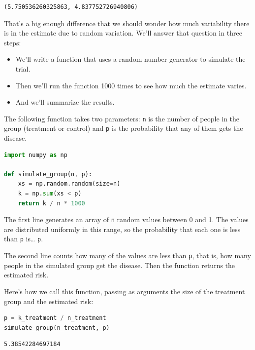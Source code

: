 \begin{lstlisting}[style=output]
(5.750536260325863, 4.837752726940806)
\end{lstlisting}

That's a big enough difference that we should wonder how much
variability there is in the estimate due to random variation. We'll
answer that question in three steps:

\begin{itemize}
\item
  We'll write a function that uses a random number generator to simulate
  the trial.
\item
  Then we'll run the function 1000 times to see how much the estimate
  varies.
\item
  And we'll summarize the results.
\end{itemize}

The following function takes two parameters: \passthrough{\lstinline!n!}
is the number of people in the group (treatment or control) and
\passthrough{\lstinline!p!} is the probability that any of them gets the
disease.

\begin{lstlisting}[language=Python,style=source]
import numpy as np

def simulate_group(n, p):
    xs = np.random.random(size=n)
    k = np.sum(xs < p)
    return k / n * 1000
\end{lstlisting}

The first line generates an array of \passthrough{\lstinline!n!} random
values between 0 and 1. The values are distributed uniformly in this
range, so the probability that each one is less than
\passthrough{\lstinline!p!} is\ldots{} \passthrough{\lstinline!p!}.

The second line counts how many of the values are less than
\passthrough{\lstinline!p!}, that is, how many people in the simulated
group get the disease. Then the function returns the estimated risk.

Here's how we call this function, passing as arguments the size of the
treatment group and the estimated risk:

\begin{lstlisting}[language=Python,style=source]
p = k_treatment / n_treatment
simulate_group(n_treatment, p)
\end{lstlisting}

\begin{lstlisting}[style=output]
5.38542284697184
\end{lstlisting}

